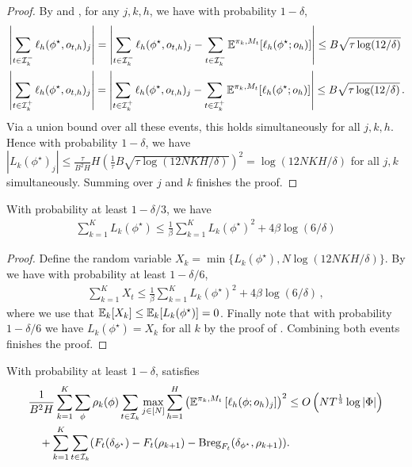 \begin{proof}
By  and , for any $j,k,h$, we have with probability $1-\delta$, 
\begin{align*}
&\left|\sum_{t\in\mathcal{I}_k^-} \ell_{h}(\phi^\star, o_{t,h})_j\right| = \left|\sum_{t\in\mathcal{I}_k^-} \ell_{h}(\phi^\star, o_{t,h})_j - \sum_{t\in\mathcal{I}_k^-} \mathbb{E}^{\pi_k, M_t}[\ell_h(\phi^\star; o_h)] \right| \leq B\sqrt{\tau \log(12/\delta)}\\
&\left|\sum_{t\in\mathcal{I}_k^+} \ell_{h}(\phi^\star, o_{t,h})_j\right| = \left|\sum_{t\in\mathcal{I}_k^+} \ell_{h}(\phi^\star, o_{t,h})_j - \sum_{t\in\mathcal{I}_k^+} \mathbb{E}^{\pi_k, M_t}[\ell_h(\phi^\star; o_h)] \right| \leq B\sqrt{\tau \log(12/\delta)}\,.
\end{align*}
Via a union bound over all these events, this holds simultaneously for all $j,k,h$. Hence with probability $1-\delta$, we have $|L_k(\phi^\star)_j|\leq \frac{\tau}{B^2H} H\left(\frac{1}{\tau}B\sqrt{\tau \log(12NKH/\delta)}\right)^2=\log(12NKH/\delta) $ for all $j,k$ simultaneously.
Summing over $j$ and $k$ finishes the proof.
\end{proof}
\begin{lemma}\label{lem: est part3}
    With probability at least $1-\delta/3$, we have
    \begin{align*}
        \sum_{k=1}^KL_k(\phi^\star) \leq 
            \frac{1}{\beta}\sum_{k=1}^KL_k(\phi^\star)^2+4\beta \log(6/\delta)
    \end{align*}
\end{lemma}
\begin{proof}
    Define the random variable $X_k = \min\{L_k(\phi^\star),N\log(12NKH/\delta) \}$. 
    By  we have with probability at least $1-\delta/6$, 
    \begin{align*}
        \sum_{k=1}^KX_t \leq \frac{1}{\beta}\sum_{k=1}^KL_k(\phi^\star)^2 + 4\beta\log(6/\delta)\,, 
    \end{align*}
    where we use that $\mathbb{E}_k[X_k]\leq \mathbb{E}_k[L_k(\phi^\star)]=0$.
    Finally note that with probability $1-\delta/6$ we have $L_k(\phi^\star)=X_k$ for all $k$ by the proof of . Combining both events finishes the proof.
\end{proof}
\begin{lemma}\label{lem: online esitmation epoch general}
    With probability at least $1-\delta$,  satisfies
    \begin{align*}
        &\frac{1}{B^2H}\sum_{k=1}^K\sum_{\phi}\rho_{k}(\phi)\sum_{t\in\mathcal{I}_k}\max_{j\in[N]}\sum_{h=1}^H \left(\mathbb{E}^{\pi_k, M_t}\left[\ell_h(\phi;o_{h})_j\right]\right)^2 \le O\left(NT^{\frac{1}{3}}\log|\Phi|\right) \\
        &\quad +  \sum_{k=1}^K \sum_{t\in\mathcal{I}_k}(  F_t(\delta_{\phi^\star}) - F_t(\rho_{k+1}) - \textup{Breg}_{F_t}(\delta_{\phi^\star}, \rho_{k+1})).  
    \end{align*}
\end{lemma}

